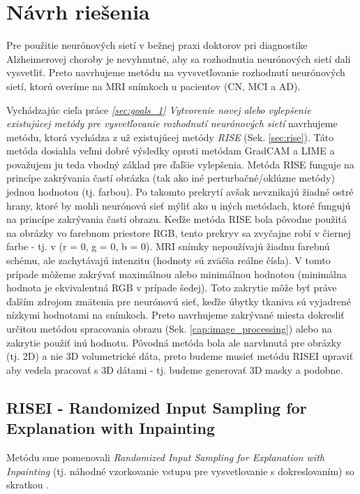 \chapter{Návrh riešenia}

Pre použitie neurónových sietí v bežnej praxi doktorov pri diagnostike Alzheimerovej choroby je nevyhnutné, aby sa rozhodnutia neurónových sietí dali vysvetliť. Preto navrhujeme metódu na vyvsvetľovanie rozhodnutí neurónových sietí, ktorú overíme na MRI snímkoch u pacientov (CN, MCI a AD).

Vychádzajúc cieľa práce \textit{\ref{sec:goals_1} Vytvorenie novej alebo vylepšenie existujúcej metódy pre vysvetľovanie rozhodnutí neurónových sietí} navrhujeme metódu, ktorá vychádza z už existujúcej metódy \textit{RISE} (Sek. \ref{sec:rise}). Táto metóda dosiahla veľmi dobré výsledky oproti metódam GradCAM a LIME a považujem ju teda vhodný základ pre ďaľšie vylepšenia. Metóda RISE funguje na princípe zakrývania častí obrázka (tak ako iné perturbačné/oklúzne metódy) jednou hodnotou (tj. farbou). Po takomto prekrytí avšak nevznikajú žiadné ostré hrany, ktoré by mohli neurónovú sieť mýliť ako u iných metódach, ktoré fungujú na princípe zakrývania častí obrazu. Keďže metóda RISE bola pôvodne použitá na obrázky vo farebnom priestore RGB, tento prekryv sa zvyčajne robí v čiernej farbe - tj. v (r = 0, g = 0, b = 0). MRI snímky nepoužívajú žiadnu farebnú schému, ale zachytávajú intenzitu (hodnoty sú zväčša reálne čísla). V tomto prípade môžeme zakrývať maximálnou alebo minimálnou hodnotou (minimálna hodnota je ekvivalentná RGB v prípade šedej). Toto zakrytie môže byť práve ďalším zdrojom zmätenia pre neurónovú sieť, keďže úbytky tkaniva sú vyjadrené nízkymi hodnotami na snímkoch. Preto navrhujeme zakrývané miesta dokresliť určitou metódou spracovania obrazu (Sek. \ref{cap:image_processing}) alebo na zakrytie použiť inú hodnotu.
Pôvodná metóda bola ale narvhnutá pre obrázky (tj. 2D) a nie 3D volumetrické dáta, preto budeme musieť metódu RISEI upraviť aby vedela pracovať s 3D dátami - tj. budeme generovať 3D masky a podobne.

\section{RISEI - Randomized Input Sampling for Explanation with Inpainting \label{sec:risei}}

Metódu sme pomenovali \textit{Randomized Input Sampling for Explanation with Inpainting} (tj. náhodné vzorkovanie vstupu pre vysvetlovanie s dokreslovaním) so skratkou .

